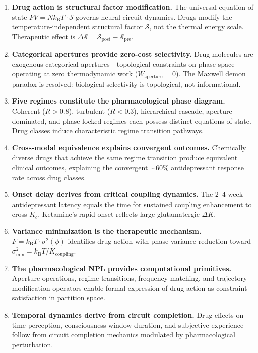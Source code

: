 \documentclass[twocolumn,10pt]{article}
\theoremstyle{remark}
\newcommand{\kB}{k_{\mathrm{B}}}
\newcommand{\Rorder}{R}
\begin{document}
\begin{enumerate}
  \item \textbf{Drug action is structural factor modification.} The universal equation of state $PV = N\kB T \cdot \mathcal{S}$ governs neural circuit dynamics. Drugs modify the temperature-independent structural factor $\mathcal{S}$, not the thermal energy scale. Therapeutic effect is $\Delta\mathcal{S} = \mathcal{S}_{\mathrm{post}} - \mathcal{S}_{\mathrm{pre}}$.

  \item \textbf{Categorical apertures provide zero-cost selectivity.} Drug molecules are exogenous categorical apertures---topological constraints on phase space operating at zero thermodynamic work ($W_{\mathrm{aperture}} = 0$). The Maxwell demon paradox is resolved: biological selectivity is topological, not informational.

  \item \textbf{Five regimes constitute the pharmacological phase diagram.} Coherent ($\Rorder > 0.8$), turbulent ($\Rorder < 0.3$), hierarchical cascade, aperture-dominated, and phase-locked regimes each possess distinct equations of state. Drug classes induce characteristic regime transition pathways.

  \item \textbf{Cross-modal equivalence explains convergent outcomes.} Chemically diverse drugs that achieve the same regime transition produce equivalent clinical outcomes, explaining the convergent $\sim\!60\%$ antidepressant response rate across drug classes.

  \item \textbf{Onset delay derives from critical coupling dynamics.} The 2--4 week antidepressant latency equals the time for sustained coupling enhancement to cross $K_c$. Ketamine's rapid onset reflects large glutamatergic $\Delta K$.

  \item \textbf{Variance minimization is the therapeutic mechanism.} $F = \kB T \cdot \sigma^2(\phi)$ identifies drug action with phase variance reduction toward $\sigma^2_{\min} = \kB T / K_{\mathrm{coupling}}$.

  \item \textbf{The pharmacological NPL provides computational primitives.} Aperture operations, regime transitions, frequency matching, and trajectory modification operators enable formal expression of drug action as constraint satisfaction in partition space.

  \item \textbf{Temporal dynamics derive from circuit completion.} Drug effects on time perception, consciousness window duration, and subjective experience follow from circuit completion mechanics modulated by pharmacological perturbation.
\end{enumerate}
\end{document}
